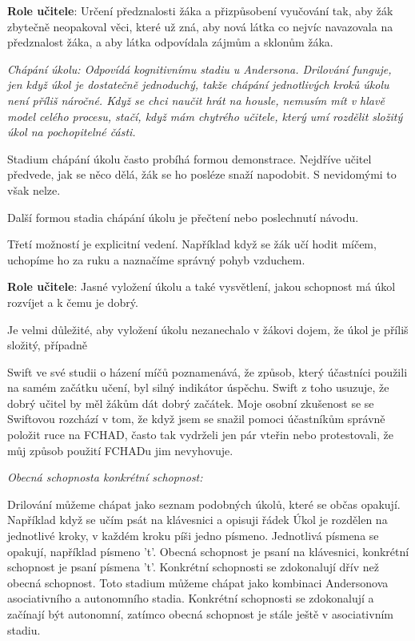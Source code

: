 {\bf Role učitele}: Určení předznalosti žáka a přizpůsobení vyučování tak, aby žák zbytečně neopakoval věci, které už zná, aby nová látka co nejvíc navazovala na předznalost žáka, a aby látka odpovídala zájmům a sklonům žáka.

\em Chápání úkolu\em : Odpovídá kognitivnímu stadiu u Andersona. Drilování funguje, jen když úkol je dostatečně jednoduchý, takže chápání jednotlivých kroků úkolu není příliš náročné.  Když se chci naučit hrát na housle, nemusím mít v hlavě model celého procesu, stačí, když mám chytrého učitele, který umí rozdělit složitý úkol na pochopitelné části.

Stadium chápání úkolu často probíhá formou demonstrace.  Nejdříve učitel předvede, jak se něco dělá, žák se ho posléze snaží napodobit.  S nevidomými to však nelze.

Další formou stadia chápání úkolu je přečtení nebo poslechnutí návodu.

Třetí možností je explicitní vedení.  Například když se žák učí hodit míčem, uchopíme ho za ruku a naznačíme správný pohyb vzduchem.

{\bf Role učitele}: Jasné vyložení úkolu a také vysvětlení, jakou schopnost má úkol rozvíjet a k čemu je dobrý.

Je velmi důležité, aby vyložení úkolu nezanechalo v žákovi dojem, že úkol je příliš složitý, případně 

Swift ve své studii o házení míčů poznamenává, že způsob, který účastníci použili na samém začátku učení, byl silný indikátor úspěchu. Swift z toho usuzuje, že dobrý učitel by měl žákům dát dobrý začátek.   \citep[str. 215]{swift1903studies}  Moje osobní zkušenost se se Swiftovou rozchází v tom, že když jsem se snažil pomoci účastníkům správně položit ruce na FCHAD, často tak vydrželi jen pár vteřin nebo protestovali, že můj způsob použití FCHADu jim nevyhovuje.

\em Obecná schopnost\em  a \em konkrétní schopnost\em :

Drilování můžeme chápat jako seznam podobných úkolů, které se občas opakují.  Například když se učím psát na klávesnici a opisuji řádek  Úkol je rozdělen na jednotlivé kroky, v každém kroku píši jedno písmeno.  Jednotlivá písmena se opakují, například písmeno 't'.  Obecná schopnost je psaní na klávesnici, konkrétní schopnost je psaní písmena 't'. Konkrétní schopnosti se zdokonalují dřív než obecná schopnost.  Toto stadium můžeme chápat jako kombinaci Andersonova asociativního a autonomního stadia.  Konkrétní schopnosti se zdokonalují a začínají být autonomní, zatímco obecná schopnost je stále ještě v asociativním stadiu.


